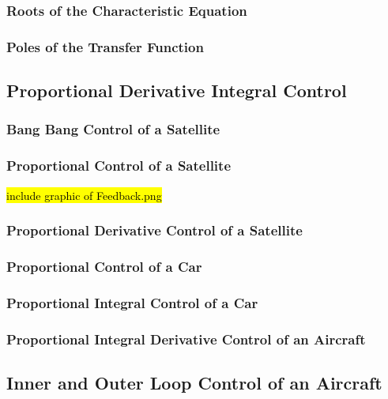 \subsubsection{Roots of the Characteristic Equation}

\subsubsection{Poles of the Transfer Function}

\subsection{Proportional Derivative Integral Control}

\subsubsection{Bang Bang Control of a Satellite}

\subsubsection{Proportional Control of a Satellite}

\hl{include graphic of Feedback.png}

\subsubsection{Proportional Derivative Control of a Satellite}

\subsubsection{Proportional Control of a Car}

\subsubsection{Proportional Integral Control of a Car}

\subsubsection{Proportional Integral Derivative Control of an Aircraft}

\subsection{Inner and Outer Loop Control of an Aircraft}

